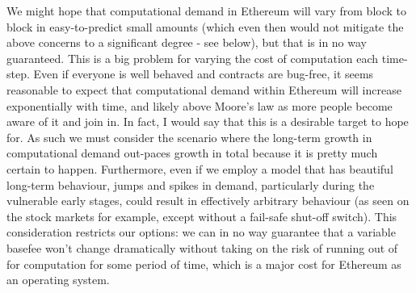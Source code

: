\documentclass[11pt,a4paper]{article}
\begin{document}
We might hope that computational demand in Ethereum will vary from block to block in easy-to-predict small amounts (which even then would not mitigate the above concerns to a significant degree - see below), but that is in no way guaranteed. This is a big problem for varying the cost of computation each time-step. Even if everyone is well behaved and contracts are bug-free, it seems reasonable to expect that computational demand within Ethereum will increase exponentially with time, and likely above Moore's law as more people become aware of it and join in. In fact, I would say that this is a desirable target to hope for. As such we must consider the scenario where the long-term growth in computational demand out-paces growth in total \ether because it is pretty much certain to happen. Furthermore, even if we employ a model that has beautiful long-term behaviour, jumps and spikes in demand, particularly during the vulnerable early stages, could result in effectively arbitrary behaviour (as seen on the stock markets for example, except without a fail-safe shut-off switch). This consideration restricts our options: we can in no way guarantee that a variable basefee won't change dramatically without taking on the risk of running out of \ether for computation for some period of time, which is a major cost for Ethereum as an operating system.
\end{document}

